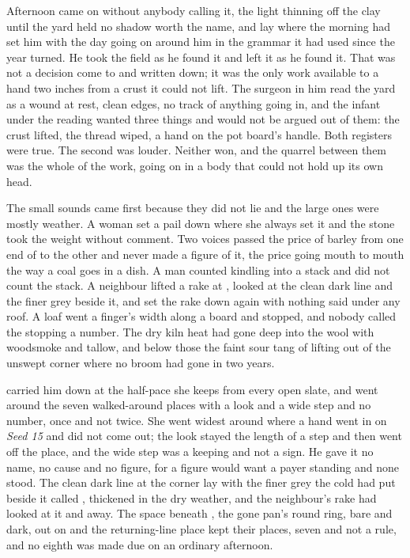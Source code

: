 Afternoon came on without anybody calling it, the light thinning off the clay until the yard held no shadow worth the name, and  lay where the morning had set him with the day going on around him in the grammar it had used since the year turned. He took the field as he found it and left it as he found it. That was not a decision come to and written down; it was the only work available to a hand two inches from a crust it could not lift. The surgeon in him read the yard as a wound at rest, clean edges, no track of anything going in, and the infant under the reading wanted three things and would not be argued out of them: the crust lifted, the thread wiped, a hand on the pot board's handle. Both registers were true. The second was louder. Neither won, and the quarrel between them was the whole of the work, going on in a body that could not hold up its own head.

The small sounds came first because they did not lie and the large ones were mostly weather. A woman set a pail down where she always set it and the stone took the weight without comment. Two voices passed the price of barley from one end of  to the other and never made a figure of it, the price going mouth to mouth the way a coal goes in a dish. A man counted kindling into a stack and did not count the stack. A neighbour lifted a rake at , looked at the clean dark line and the finer grey beside it, and set the rake down again with nothing said under any roof. A loaf went a finger's width along a board and stopped, and nobody called the stopping a number. The dry kiln heat had gone deep into the wool with woodsmoke and tallow, and below those the faint sour tang of  lifting out of the unswept corner where no broom had gone in two years.

 carried him down at the half-pace she keeps from every open slate, and went around the seven walked-around places with a look and a wide step and no number, once and not twice. She went widest around  where a hand went in on \emph{Seed 15} and did not come out; the look stayed the length of a step and then went off the place, and the wide step was a keeping and not a sign. He gave it no name, no cause and no figure, for a figure would want a payer standing and none stood. The clean dark line at the corner lay with the finer grey the cold had put beside it called , thickened in the dry weather, and the neighbour's rake had looked at it and away. The space beneath , the gone pan's round ring,  bare and dark,  out on  and the returning-line place kept their places, seven and not a rule, and no eighth was made due on an ordinary afternoon.


